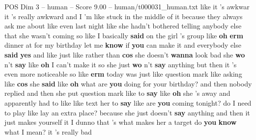 \begin{textsample}{POS Dim 3 – human – Score 9.00 – human/t000031\_human.txt}  \label{ex:f3_pos_001}
like it 's awkwar it 's really awkward and I 'm like stuck in the middle of it because they always ask me about like even last night like she hadn't bothered telling anybody else that she wasn't coming so like I basically \textbf{said} on the girl 's group like \textbf{oh} \textbf{erm} dinner at for my birthday let me \textbf{know} if \textbf{you} can make it and everybody else \textbf{said} \textbf{yes} and like just like rather than \textbf{cos} she doesn't \textbf{wanna} look bad she \textbf{wo} n't \textbf{say} like \textbf{oh} I can't make it so she just \textbf{wo} n't \textbf{say} anything but then it 's even more noticeable so like \textbf{erm} today was just like question mark like asking like \textbf{cos} she \textbf{said} like \textbf{oh} what are \textbf{you} doing for your birthday? and then nobody replied and then she put question mark like to \textbf{say} like \textbf{oh} she 's away and apparently had to like like text her to \textbf{say} like are \textbf{you} coming tonight? do I need to play like lay an extra place? because she just doesn't \textbf{say} anything and then it just makes yourself it I dunno that 's what makes her a target do \textbf{you} \textbf{know} what I mean? it 's really bad

\end{textsample}
